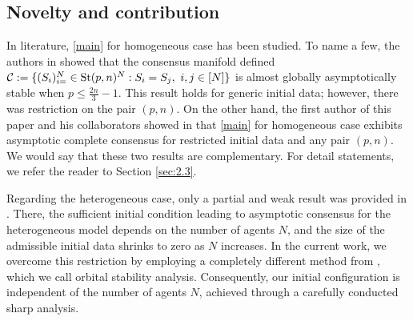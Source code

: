 \documentclass[11pt,reqno]{amsart}
\numberwithin{figure}{section}
\newcommand{\St}{  {\textup{St}}(p,n) }
\begin{document}
 

 


\subsection{Novelty and contribution} 
In literature, \eqref{main} for homogeneous case has been studied. To name a few, the authors in \cite{M1,M2} showed that the consensus manifold  defined $\mathcal C := \{ (S_i)_{i=}^N \in \St^N : S_i = S_j,~i,j\in [N]\}$ is almost globally asymptotically stable when $p \leq \frac{2n}{3} -1$. This result holds for generic initial data; however, there was  restriction on the pair $(p,n)$. On the other hand, the first author of this paper and his collaborators showed in \cite{HKK22} that \eqref{main} for homogeneous case exhibits asymptotic complete consensus for restricted initial data and any pair $(p,n)$. We would say that these two results are complementary.  For detail statements, we refer the reader to Section \ref{sec:2.3}. 


Regarding the heterogeneous case, only a partial and weak result was provided in \cite{HKK22}. There, the sufficient initial condition leading to asymptotic consensus for the heterogeneous model depends on the number of agents $N$, and the size of the admissible initial data shrinks to zero as $N$ increases. In the current work, we overcome this restriction by employing a completely different method from \cite{HKK22}, which we call orbital stability analysis. Consequently, our initial configuration is independent of the number of agents $N$, achieved through a carefully conducted sharp analysis.
\end{document}
